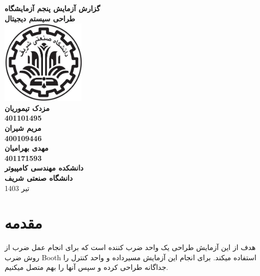 \documentclass{article}
\begin{document}
\begin{titlepage}
    \begin{center}
        \textbf{\Huge{گزارش آزمایش پنجم آزمایشگاه
        \\ طراحی سیستم دیجیتال}}\\
        \vspace{1cm}
        \includegraphics[width=0.3\textwidth]{sharif.jpg}\\
        \vspace{1cm}
        \textbf{ \Large{مزدک تیموریان}}\\
        \vspace{0.4cm}
        \textbf{ \large{401101495}}\\
        \vspace{0.5cm}
        \textbf{ \Large{مریم شیران}}\\
        \vspace{0.4cm}
        \textbf{ \large{400109446}}\\
        \vspace{0.5cm}
        \textbf{ \Large{مهدی بهرامیان}}\\
        \vspace{0.4cm}
        \textbf{ \large{401171593}}\\
        \vspace{1cm}
        \textbf{ \Large{دانشکده مهندسی کامپیوتر}}\\
        \vspace{0.4cm}
        \textbf{ \Large{دانشگاه صنعتی شریف}}\\
        \vspace{0.6cm}
        \large{تیر 1403}
    \end{center}
    \thispagestyle{empty}
\end{titlepage}

\tableofcontents

\newpage

\section{مقدمه}
هدف از اين آزمايش طراحی یک واحد ضرب كننده است كه برای انجام عمل ضرب از روش ضرب
Booth
استفاده میکند.
برای انجام این آزمايش 
مسيرداده و واحد كنترل را جداگانه طراحی
کرده و سپس آنها را بهم متصل میکنیم.
\end{document}
